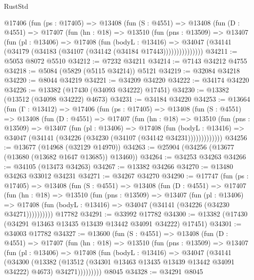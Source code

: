 \begin{lexlean}{RustStd}
\begin{coremodule}
      @17406
        (fun (ps : @17405) =>
        @13408
          (fun (S : @4551) =>
          @13408
            (fun (D : @4551) =>
            @17407
              (fun (hn : @18) =>
              @13510
                (fun (pns : @13509) =>
                @13407
                  (fun (pl : @13406) =>
                  @17408
                    (fun (bodyL : @13416) =>
                    @34047 (@34141 (@34179 (@34183 (@34107 (@34142 (@34184 @17443)))))))))))))))
@34211 := @5053 @8072 @5510
@34212 := @7232 @34211
@34214 := @7143 @34212 @4755
@34218 := @5084 (@5829 (@5115 @34214)) @5121
@34219 := @32084 @34218
@34220 := @8044 @34219
@34221 := @34209 @34220
@34222 := @34174 @34220
@34226 := @13382 (@17430 (@34093 @34222) @17451)
@34230 := @13382 (@13512 (@34098 @34222) @4673)
@34231 := @34184 @34220
@34253 := @13664
    (fun (Γ : @13412) =>
    @17406
      (fun (ps : @17405) =>
      @13408
        (fun (S : @4551) =>
        @13408
          (fun (D : @4551) =>
          @17407
            (fun (hn : @18) =>
            @13510
              (fun (pns : @13509) =>
              @13407
                (fun (pl : @13406) =>
                @17408
                  (fun (bodyL : @13416) =>
                  @34047 (@34141 (@34226 (@34230 (@34107 (@34142 @34231)))))))))))))
@34256 := @13677 (@14968 (@32129 @14970))
@34263 := @25904 (@34256 (@13677 (@13680 (@13682 @1647 @13685)) @13460))
@34264 := @34253 @34263
@34266 := @34105 (@13473 @34263)
@34267 := @13382 @34266
@34270 := @13480 @34263 @33012 @34231
@34271 := @34267 @34270
@34290 := @17747
    (fun (ps : @17405) =>
    @13408
      (fun (S : @4551) =>
      @13408
        (fun (D : @4551) =>
        @17407
          (fun (hn : @18) =>
          @13510
            (fun (pns : @13509) =>
            @13407
              (fun (pl : @13406) =>
              @17408 (fun (bodyL : @13416) => @34047 (@34141 (@34226 (@34230 @34271))))))))))
    @17782
@34291 := @33992 @17782
@34300 := @13382 (@17430 (@34291 @13463 @13435 @13439 @13442 @34091 @34222) @17451)
@34301 := @34003 @17782
@34327 := @13600
    (fun (S : @4551) =>
    @13408
      (fun (D : @4551) =>
      @17407
        (fun (hn : @18) =>
        @13510
          (fun (pns : @13509) =>
          @13407
            (fun (pl : @13406) =>
            @17408
              (fun (bodyL : @13416) =>
              @34047
                (@34141
                  (@34300
                    (@13382
                      (@13512 (@34301 @13463 @13435 @13439 @13442 @34091 @34222) @4673)
                      @34271)))))))))
    @8045
@34328 := @34291 @8045

\end{coremodule}
\end{lexlean}
